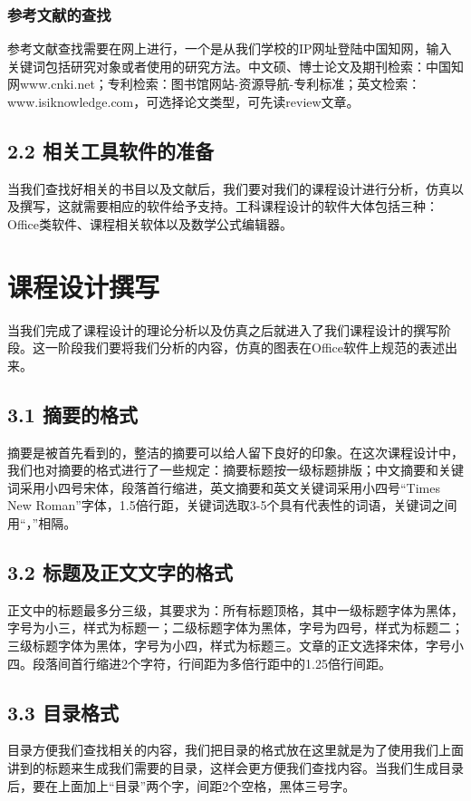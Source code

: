 \documentclass[12pt]{ctexart}
\begin{document}
\subsubsection{参考文献的查找}
参考文献查找需要在网上进行，一个是从我们学校的IP网址登陆中国知网，输入关键词包括研究对象或者使用的研究方法。中文硕、博士论文及期刊检索：中国知网www.cnki.net；专利检索：图书馆网站-资源导航-专利标准；英文检索：www.isiknowledge.com，可选择论文类型，可先读review文章。

\subsection{2.2 相关工具软件的准备}
当我们查找好相关的书目以及文献后，我们要对我们的课程设计进行分析，仿真以及撰写，这就需要相应的软件给予支持。工科课程设计的软件大体包括三种：Office类软件、课程相关软体以及数学公式编辑器。

\section{课程设计撰写}
当我们完成了课程设计的理论分析以及仿真之后就进入了我们课程设计的撰写阶段。这一阶段我们要将我们分析的内容，仿真的图表在Office软件上规范的表述出来。

\subsection{3.1 摘要的格式}
摘要是被首先看到的，整洁的摘要可以给人留下良好的印象。在这次课程设计中，我们也对摘要的格式进行了一些规定：摘要标题按一级标题排版；中文摘要和关键词采用小四号宋体，段落首行缩进，英文摘要和英文关键词采用小四号“Times New Roman”字体，1.5倍行距，关键词选取3-5个具有代表性的词语，关键词之间用“，”相隔。

\subsection{3.2 标题及正文文字的格式}
正文中的标题最多分三级，其要求为：所有标题顶格，其中一级标题字体为黑体，字号为小三，样式为标题一；二级标题字体为黑体，字号为四号，样式为标题二；三级标题字体为黑体，字号为小四，样式为标题三。文章的正文选择宋体，字号小四。段落间首行缩进2个字符，行间距为多倍行距中的1.25倍行间距。

\subsection{3.3 目录格式}
目录方便我们查找相关的内容，我们把目录的格式放在这里就是为了使用我们上面讲到的标题来生成我们需要的目录，这样会更方便我们查找内容。当我们生成目录后，要在上面加上“目录”两个字，间距2个空格，黑体三号字。
\end{document}
